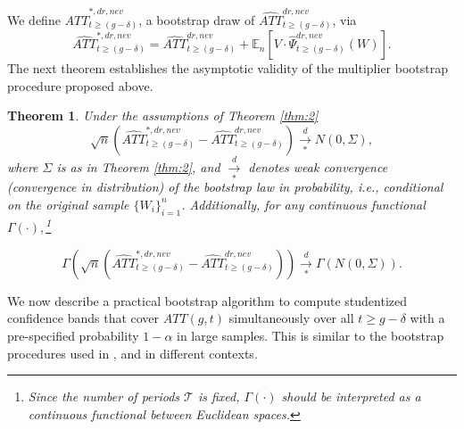\documentclass[11pt]{article}%
\theoremstyle{plain}
\newtheorem{theorem}{Theorem}
\numberwithin{sassumption}{section}
\numberwithin{equation}{section}
\begin{document}
We define $\widehat{ATT}_{t\geq\left(  g-\delta\right)  }^{\ast,dr,nev}$, a
bootstrap draw of $\widehat{ATT}_{t\geq\left(  g-\delta\right)  }^{dr,nev}$,
via
\begin{equation}
\widehat{ATT}_{t\geq\left(  g-\delta\right)  }^{\ast,dr,nev}=\widehat{ATT}%
_{t\geq\left(  g-\delta\right)  }^{dr,nev}+\mathbb{E}_{n}\left[
V\cdot\widehat{\Psi}_{t\geq\left(  g-\delta\right)  }^{dr,nev}(W)\right]  .
\label{eqn:att.boot}%
\end{equation}
The next theorem establishes the asymptotic validity of the multiplier
bootstrap procedure proposed above.

\begin{theorem}
\label{thm:bootstrap} Under the assumptions of Theorem \ref{thm:2}
\[
\sqrt{n}\left(  \widehat{ATT}_{t\geq\left(  g-\delta\right)  }^{\ast
,dr,nev}-\widehat{ATT}_{t\geq\left(  g-\delta\right)  }^{dr,nev}\right)
\underset{\ast}{\overset{d}{\rightarrow}}N(0,\Sigma),
\]
where $\Sigma$ is as in Theorem \ref{thm:2}, and $\underset{\ast
}{\overset{d}{\rightarrow}}$ denotes weak convergence (convergence in
distribution) of the bootstrap law in probability, i.e., conditional on the
original sample $\{W_{i}\}_{i=1}^{n}$. Additionally, for any continuous
functional $\Gamma(\cdot),$\footnote{Since the number of periods $\mathcal{T}$ is fixed, $\Gamma(\cdot)$ should be interpreted as a continuous functional between Euclidean spaces.}

\[
\Gamma\left(  \sqrt{n}\left(  \widehat{ATT}_{t\geq\left(  g-\delta\right)
}^{\ast,dr,nev}-\widehat{ATT}_{t\geq\left(  g-\delta\right)  }^{dr,nev}%
\right)  \right)  \underset{\ast}{\overset{d}{\rightarrow}}\Gamma\left(
N(0,\Sigma)\right)  .
\]

\end{theorem}

We now describe a practical bootstrap algorithm to compute studentized
confidence bands that cover $ATT\left(  g,t\right)  $ simultaneously over all
$t\geq g-\delta$ with a pre-specified probability $1-\alpha$ in large samples.
This is similar to the bootstrap procedures used in \cite{Kline2012},
\cite{Belloni2017} and \cite{chernozhukov2018sorted} in different contexts.
\end{document}
